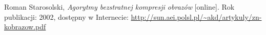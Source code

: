 \documentclass[a4paper]{article}
\begin{document}
	
	
	\tableofcontents
	\newpage
	
	
	
	
	
	
	
	
	
	
	
	
	\begin{thebibliography}{2}
		
		 Roman Starosolski, \textit{Agorytmy bezstratnej kompresji obrazów} [online]. Rok publikacji:  2002, dostępny w Internecie: \url{http://sun.aei.polsl.pl/~akd/artykuly/zn-kobrazow.pdf}
		
	\end{thebibliography}
\end{document}

